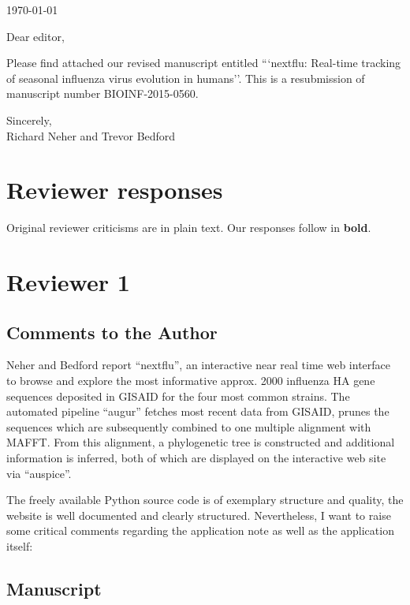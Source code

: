 \documentclass[11pt,oneside,letterpaper]{article}
\begin{document}

\today

\vspace{1cm}

Dear editor,

Please find attached our revised manuscript entitled ```nextflu: Real-time tracking of seasonal influenza virus evolution in humans''.  This is a resubmission of manuscript number BIOINF-2015-0560.

Sincerely,\\
Richard Neher and Trevor Bedford

\restoregeometry

\newpage

\section*{Reviewer responses}

Original reviewer criticisms are in plain text.  Our responses follow in \textbf{bold}.  

\section*{Reviewer 1}

\subsection*{Comments to the Author}

Neher and Bedford report “nextflu”, an interactive near real time web interface to browse and explore the most informative approx. 2000 influenza HA gene sequences deposited in GISAID for the four most common strains. The automated pipeline “augur” fetches most recent data from GISAID, prunes the sequences which are subsequently combined to one multiple alignment with MAFFT. From this alignment, a phylogenetic tree is constructed and additional information is inferred, both of which are displayed on the interactive web site via “auspice”.

The freely available Python source code is of exemplary structure and quality, the website is well documented and clearly structured. Nevertheless, I want to raise some critical comments regarding the application note as well as the application itself:

\subsection*{Manuscript}
\end{document}
